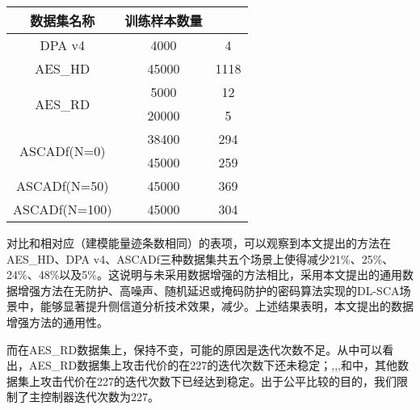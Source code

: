 {	\begin{table}[!h]
		\label{tab:originmtd}
		\centering
		\small
		\begin{tabular}{ccc}
			\hline
			数据集名称&训练样本数量&\chenggongtiaoshu \\
			\hline
			DPA v4    &4000&4\\
			AES\_HD   &45000&1118\\
			\multirow{2}{*}{AES\_RD}
			&5000&12\\
			&20000&5\\
			\multirow{2}{*}{ASCADf(N=0)}
			&38400&294\\
			&45000&259\\
			ASCADf(N=50)&45000&369\\
			ASCADf(N=100)&45000&304\\
			\hline
		\end{tabular}
	\end{table}

	对比和相对应（建模能量迹条数相同）的表项，可以观察到本文提出的方法在AES\_HD、DPA v4、ASCADf三种数据集共五个场景上使得\chenggongtiaoshu 减少21\%、25\%、24\%、48\%以及5\%。这说明与未采用数据增强的方法相比，采用本文提出的通用数据增强方法在无防护、高噪声、随机延迟或掩码防护的密码算法实现的DL-SCA场景中，能够显著提升侧信道分析技术效果，减少\chenggongtiaoshu 。上述结果表明，本文提出的数据增强方法的通用性。
	
	而在AES\_RD数据集上，\chenggongtiaoshu 保持不变，可能的原因是迭代次数不足。从中可以看出，AES\_RD数据集上攻击代价的在227的迭代次数下还未稳定；,,,和中，其他数据集上攻击代价在227的迭代次数下已经达到稳定。出于公平比较的目的，我们限制了主控制器迭代次数为227。
	
%
}

